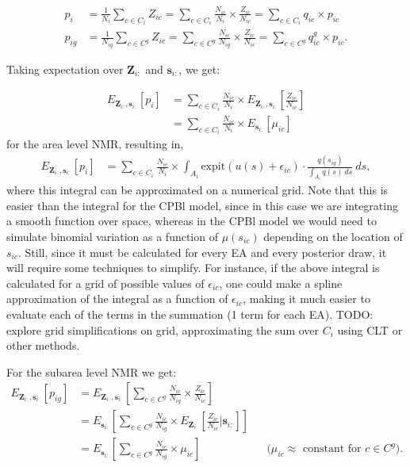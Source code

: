 \documentclass[12pt]{article}
\begin{document}
\begin{align*}
p_i &= \frac{1}{N_i}\sum_{c \in C_i} Z_{ic} = \sum_{c \in C_i} \frac{N_{ic}}{N_i}  \times \frac{Z_{ic}}{N_{ic}}  =  \sum_{c \in C_i} q_{ic} \times p_{ic} \\
p_{ig} &= \frac{1}{N_{ig}} \sum_{c \in C^g} Z_{ic} = \sum_{c \in C^g} \frac{N_{ic}}{N_{ig}}  \times \frac{Z_{ic}}{N_{ic}}  =  \sum_{c \in C^g} q_{ic}^g \times p_{ic}.
\end{align*}

Taking expectation over $\boldsymbol{Z}_{i:}$ and $\boldsymbol{s}_{i:}$, we get: 

\begin{align*}
E_{\boldsymbol{Z}_{i:},\boldsymbol{s}_{i:}}  \left [ p_{i} \right ] &= \sum_{c \in C_i} \frac{N_{ic}}{N_i}  \times E_{\boldsymbol{Z}_{i:},\boldsymbol{s}_{i:}}  \left [\frac{Z_{ic}}{N_{ic}}  \right ] \\
&= \sum_{c \in C_i} \frac{N_{ic}}{N_i}  \times E_{\boldsymbol{s}_{i:}}  \left [\mu_{ic} \right ]
\end{align*}
for the area level NMR, resulting in, 
\begin{align}
E_{\boldsymbol{Z}_{i:},\boldsymbol{s}_{i:}}  \left [ p_{i} \right ] &= \sum_{c \in C_i} \frac{N_{ic}}{N_i}  \times \int_{A_i} \mbox{expit}(u(s) + \epsilon_{ic}) \cdot \frac{q(s_{ig})}{\int_{A_i} q(s) \ ds} \ d s, \label{eq:CPblCounty}
\end{align}
where this integral can be approximated on a numerical grid. Note that this is easier than the integral for the CPBl model, since in this case we are integrating a smooth function over space, whereas in the CPBl model we would need to simulate binomial variation as a function of $\mu(s_{ic})$ depending on the location of $s_{ic}$. Still, since it must be calculated for every EA and every posterior draw, it will require some techniques to simplify.  For instance, if the above integral is calculated for a grid of possible values of $\epsilon_{ic}$, one could make a spline approximation of the integral as a function of $\epsilon_{ic}$, making it much easier to evaluate each of the terms in the summation (1 term for each EA). TODO: explore grid simplifications on grid, approximating the sum over $C_i$ using CLT or other methods.

For the subarea level NMR we get:
\begin{align*}
E_{\boldsymbol{Z}_{i:},\boldsymbol{s}_{i:}}  \left [ p_{ig} \right ] &= E_{\boldsymbol{Z}_{i:},\boldsymbol{s}_{i:}}  \left [ \sum_{c \in C^g} \frac{N_{ic}}{N_{ig}}  \times  \frac{Z_{ic}}{N_{ic}}  \right ] \\
&= E_{\boldsymbol{s}_{i:}}  \left [ \sum_{c \in C^g} \frac{N_{ic}}{N_{ig}}  \times E_{\boldsymbol{Z}_{i:}}  \left [ \frac{Z_{ic}}{N_{ic}} \Big \vert \boldsymbol{s}_{i:} \right ] \right ] \\
&= E_{\boldsymbol{s}_{i:}}  \left [ \sum_{c \in C^g} \frac{N_{ic}}{N_{ig}}  \times \mu_{ic} \right ] && \text{($\mu_{ic}\approx$ constant for $c \in C^g$)}.
\end{align*}
\end{document}
